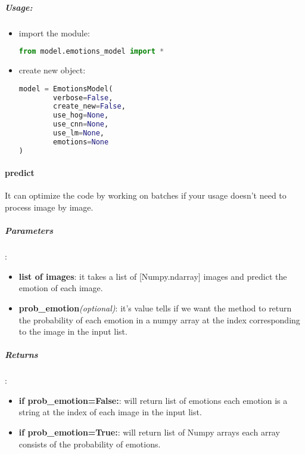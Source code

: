 \subparagraph{Usage:}
\begin{changemargin}{0.5cm}{0cm}
\begin{itemize}
\item import the module:
\begin{lstlisting}[language=Python]
from model.emotions_model import *\end{lstlisting}

\item create new object:
\begin{lstlisting}[language=Python]
model = EmotionsModel(
		verbose=False,
		create_new=False,
		use_hog=None,
		use_cnn=None,
		use_lm=None,
		emotions=None
)\end{lstlisting}

\end{itemize}
\end{changemargin}

\paragraph{predict}It can optimize the code by working on batches if your usage doesn't need to process image by image.

\subparagraph{Parameters}:
\begin{changemargin}{0.5cm}{0cm}
\begin{itemize}
	\item \textbf{list of images}:\newline
	it takes a list of [Numpy.ndarray] images and predict the emotion of each image.
	\item \textbf{prob\_emotion}\textit{(optional)}:\newline
	it's value tells if we want the method to return the probability of each emotion in a numpy array at the index corresponding to the image in the input list. 
\end{itemize}
\end{changemargin}

\subparagraph{Returns}:
\begin{changemargin}{0.5cm}{0cm}
\begin{itemize}
	\item \textbf{if prob\_emotion=False:}:\newline
	will return list of emotions each emotion is a string at the index of each image in the input list.
	\item \textbf{if prob\_emotion=True:}:\newline
	will return list of Numpy arrays each array consists of the probability of emotions.
\end{itemize}
\end{changemargin}

